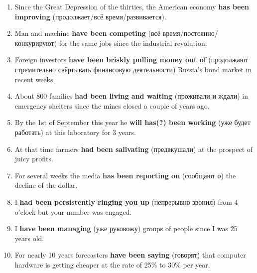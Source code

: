 \documentclass[main.tex]{subfiles}
\begin{document}

\begin{enumerate}[nosep,leftmargin=*]
	\itemsep\eitsp
	\item Since the Great Depression of the thirties, the American economy \textbf{has been improving} (продолжает/всё время/развивается).
	\item Man and machine \textbf{have been competing} (всё время/постоянно/конкурируют) for the same jobs since the industrial revolution.
	\item Foreign investors \textbf{have been briskly pulling money out of} (продолжают стремительно свёртывать финансовую деятельности) Russia's bond market in recent weeks.
	\item About 800 families \textbf{had been living and waiting} (проживали и ждали) in emergency shelters since the mines closed a couple of years ago.
	\item By the 1st of September this year he \textbf{will has(?) been working} (уже будет работать) at this laboratory for 3 years.
	\item At that time farmers \textbf{had been salivating} (предвкушали) at the prospect of juicy profits.
	\item For several weeks the media \textbf{has been reporting on} (сообщают о) the decline of the dollar.
	\item I \textbf{had been persistently ringing you up} (непрерывно звонил) from 4 o'clock but your number was engaged.
	\item I \textbf{have been managing} (уже руковожу) groups of people since I was 25 years old.
	\item For nearly 10 years forecasters \textbf{have been saying} (говорят) that computer hardware is getting cheaper at the rate of 25\% to 30\% per year.
\end{enumerate}

\newpage
\setcounter{subsection}{2}

\end{document}

